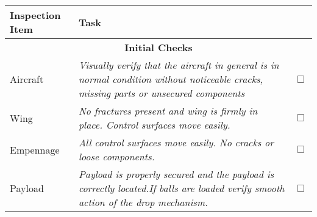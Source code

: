 \begin{center}
\begin{tabular}{p{}p{}p{}}

\hline
\textbf{Inspection Item} & \textbf{Task}& \\

\hline
\multicolumn{3}{c}{\textbf{Initial Checks}} \\

\hline
Aircraft & \textit{Visually verify that the aircraft in general is in 
normal condition without noticeable cracks, missing parts or unsecured 
components} & $\Box$ \\

\hline
Wing & \textit{No fractures present and wing is firmly in place. 
Control surfaces move easily.} &  $\Box$ \\

\hline
Empennage & \textit{All control surfaces move easily. No cracks or loose components.} & $\Box$ \\

\hline
Payload & \textit{Payload is properly secured and the payload is correctly located.If balls are loaded verify smooth action of the drop mechanism.} &  $\Box$ \\


\end{tabular}
\end{center}

